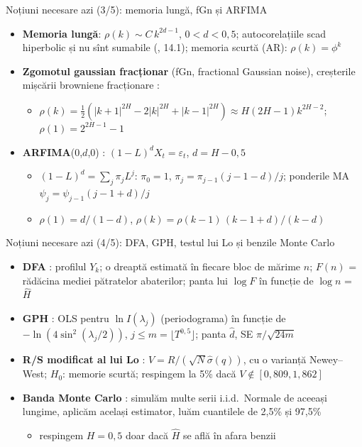 \begin{frame}{Noțiuni necesare azi (3/5): memoria lungă, fGn și ARFIMA}
\itemsize{\footnotesize}
\begin{itemize}
    \item \textbf{Memoria lungă}: $\rho(k) \sim C\,k^{2d - 1}$, $0 < d < 0{,}5$; autocorelațiile scad hiperbolic și nu sînt sumabile (, 14.1); memoria scurtă (AR): $\rho(k) = \phi^k$
    \item \textbf{Zgomotul gaussian fracționar} (fGn, fractional Gaussian noise), creșterile mișcării browniene fracționare :
    \begin{itemize}
        \item $\rho(k) = \tfrac12\left(|k + 1|^{2H} - 2|k|^{2H} + |k - 1|^{2H}\right) \approx H(2H - 1)k^{2H - 2}$; $\rho(1) = 2^{2H - 1} - 1$
    \end{itemize}
    \item \textbf{ARFIMA}(0,$d$,0) : $(1 - L)^d X_t = \varepsilon_t$, $d = H - 0{,}5$
    \begin{itemize}
        \item $(1 - L)^d = \sum_j \pi_j L^j$: $\pi_0 = 1$, $\pi_j = \pi_{j-1}(j - 1 - d)/j$; ponderile MA $\psi_j = \psi_{j-1}(j - 1 + d)/j$
        \item $\rho(1) = d/(1 - d)$, $\rho(k) = \rho(k - 1)\,(k - 1 + d)/(k - d)$
    \end{itemize}
\end{itemize}
\end{frame}

\begin{frame}{Noțiuni necesare azi (4/5): DFA, GPH, testul lui Lo și benzile Monte Carlo}
\itemsize{\footnotesize}
\begin{itemize}
    \item \textbf{DFA} : profilul $Y_k$; o dreaptă estimată în fiecare bloc de mărime $n$; $F(n)$ = rădăcina mediei pătratelor abaterilor; panta lui $\log F$ în funcție de $\log n$ = $\hat H$
    \item \textbf{GPH} : OLS pentru $\ln I(\lambda_j)$ (periodograma) în funcție de $-\ln(4\sin^2(\lambda_j/2))$, $j \le m = \lfloor T^{0{,}5}\rfloor$; panta $\hat d$, SE $\pi/\sqrt{24m}$
    \item \textbf{R/S modificat al lui Lo} : $V = R/(\sqrt{N}\hat\sigma(q))$, cu o varianță Newey--West; $H_0$: memorie scurtă; respingem la 5\% dacă $V \notin [0{,}809, 1{,}862]$
    \item \textbf{Banda Monte Carlo} : simulăm multe serii i.i.d.\ Normale de aceeași lungime, aplicăm același estimator, luăm cuantilele de 2,5\% și 97,5\%
    \begin{itemize}
        \item respingem $H = 0{,}5$ doar dacă $\hat H$ se află în afara benzii
    \end{itemize}
\end{itemize}
\end{frame}

